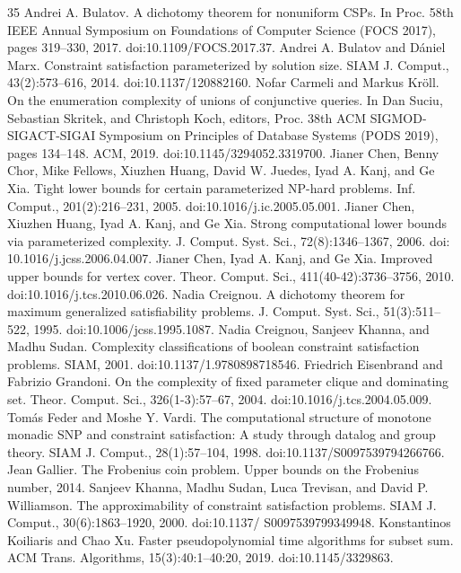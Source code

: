 \begin{thebibliography}{35}
Andrei A. Bulatov. A dichotomy theorem for nonuniform CSPs. In Proc. 58th IEEE Annual Symposium on Foundations of Computer Science (FOCS 2017), pages 319–330, 2017. doi:10.1109/FOCS.2017.37.
Andrei A. Bulatov and Dániel Marx. Constraint satisfaction parameterized by solution size. SIAM J. Comput., 43(2):573–616, 2014. doi:10.1137/120882160.
Nofar Carmeli and Markus Kröll. On the enumeration complexity of unions of conjunctive queries. In Dan Suciu, Sebastian Skritek, and Christoph Koch, editors, Proc. 38th ACM SIGMOD-SIGACT-SIGAI Symposium on Principles of Database Systems (PODS 2019), pages 134–148. ACM, 2019. doi:10.1145/3294052.3319700.
Jianer Chen, Benny Chor, Mike Fellows, Xiuzhen Huang, David W. Juedes, Iyad A. Kanj, and Ge Xia. Tight lower bounds for certain parameterized NP-hard problems. Inf. Comput., 201(2):216–231, 2005. doi:10.1016/j.ic.2005.05.001.
Jianer Chen, Xiuzhen Huang, Iyad A. Kanj, and Ge Xia. Strong computational lower bounds via parameterized complexity. J. Comput. Syst. Sci., 72(8):1346–1367, 2006. doi: 10.1016/j.jcss.2006.04.007.
Jianer Chen, Iyad A. Kanj, and Ge Xia. Improved upper bounds for vertex cover. Theor. Comput. Sci., 411(40-42):3736–3756, 2010. doi:10.1016/j.tcs.2010.06.026.
Nadia Creignou. A dichotomy theorem for maximum generalized satisfiability problems. J. Comput. Syst. Sci., 51(3):511–522, 1995. doi:10.1006/jcss.1995.1087.
Nadia Creignou, Sanjeev Khanna, and Madhu Sudan. Complexity classifications of boolean constraint satisfaction problems. SIAM, 2001. doi:10.1137/1.9780898718546.
Friedrich Eisenbrand and Fabrizio Grandoni. On the complexity of fixed parameter clique and dominating set. Theor. Comput. Sci., 326(1-3):57–67, 2004. doi:10.1016/j.tcs.2004.05.009.
Tomás Feder and Moshe Y. Vardi. The computational structure of monotone monadic SNP and constraint satisfaction: A study through datalog and group theory. SIAM J. Comput., 28(1):57–104, 1998. doi:10.1137/S0097539794266766.
Jean Gallier. The Frobenius coin problem. Upper bounds on the Frobenius number, 2014.
Sanjeev Khanna, Madhu Sudan, Luca Trevisan, and David P. Williamson. The approximability of constraint satisfaction problems. SIAM J. Comput., 30(6):1863–1920, 2000. doi:10.1137/ S0097539799349948.
Konstantinos Koiliaris and Chao Xu. Faster pseudopolynomial time algorithms for subset sum. ACM Trans. Algorithms, 15(3):40:1–40:20, 2019. doi:10.1145/3329863.

\end{thebibliography}
